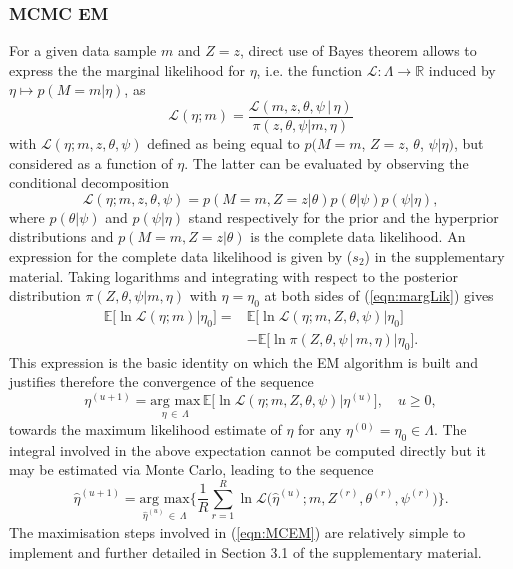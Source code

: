 \documentclass{bioinfo}
\begin{document}
\subsubsection{MCMC EM}\label{sec:MCMCEM}
For a given data sample $m$ and $Z = z$, direct use of Bayes theorem 
allows to  express the the marginal likelihood for $\eta$, i.e. the
function $\mathcal L: \Lambda \to \mathbb R$ induced by $\eta 
\mapsto p(M=m|\eta)$, as
\begin{equation}
  \label{eqn:margLik}
  \mathcal L(\eta; m) 
  = \frac{\mathcal L(m, z, \theta, \psi\,|\,\eta)}{\pi(z,
      \theta, \psi|m, \eta)}
\end{equation}
with $\mathcal L(\eta; m, z, \theta, \psi)$ 
defined as being equal to  $p(M=m$, $Z=z$, $\theta$,
$\psi|\eta)$, but considered as a function of $\eta$.  The latter
can be evaluated by observing the conditional decomposition
\[
   \mathcal L(\eta; m, z, \theta, \psi) 
  = 
   p(M=m, Z=z|\theta) p(\theta|\psi)p(\psi|\eta), 
\]
where $p(\theta|\psi)$ and $p(\psi|\eta)$ stand respectively for the
prior and the hyperprior distributions and $p(M=m, Z=z|\theta)$ is the
complete data likelihood. An expression for the complete data
likelihood is given by ($s_2$) in the supplementary material. Taking
logarithms and integrating with respect to the posterior distribution
$\pi(Z, \theta, \psi|m, \eta)$ with $\eta = \eta_0$ at both sides of
(\ref{eqn:margLik}) gives 
\begin{align*}
   \mathbb E\big[\ln\mathcal L(\eta; m) \big| \eta_0\big] 
  =& 
  \mathbb E\big[\ln\mathcal L(\eta; m, Z, \theta, \psi)
    \big|  \eta_0\big]\\ 
  &-
  \mathbb E\big[\ln \pi(Z, \theta, \psi\,|\,m,\eta)\big| \eta_0\big].
\end{align*}  
This expression is the basic identity on which the EM algorithm is
built and justifies therefore the convergence of the sequence
\begin{equation}
 \label{eqn:EofMCEM}
  \eta^{(u+1)} = \underset{\eta\,\in\, \Lambda}{\text{arg max}}\, 
  \mathbb E\Big[\ln\mathcal L(\eta; m, Z, \theta, \psi)\big|
  \eta^{(u)}\Big], 
  \quad u\geqslant 0,
\end{equation}
towards the maximum likelihood estimate of $\eta$ for any $\eta^{(0)}
= \eta_0  \in \Lambda$. The integral involved in the above expectation
cannot be computed directly but it may be estimated via Monte Carlo,
leading to the sequence 
\begin{equation}
 \label{eqn:MCEM}
   \hat\eta^{(u+1)}
 = 
    \underset{\hat\eta^{(u)}\,\in\,\Lambda}{\text{arg max}} 
   \bigg\{
    \frac{1}{R}\sum_{r=1}^R 
      \ln\mathcal L\Big(\hat\eta^{(u)}; m, Z^{(r)}, \theta^{(r)},
      \psi^{(r)}\Big)
   \bigg\}.
\end{equation}
The maximisation steps involved in (\ref{eqn:MCEM}) are relatively
simple to implement and further detailed in Section 3.1 of the
supplementary material.
\end{document}
